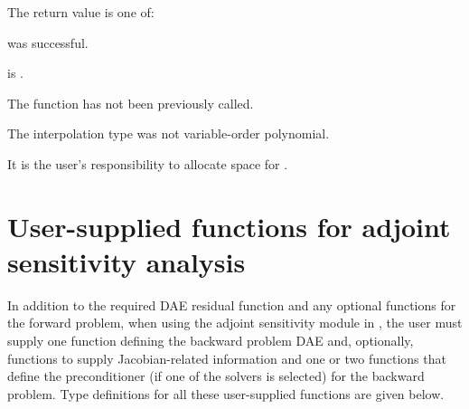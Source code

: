 {
  The return value  is one of:
  \begin{args}
  \item[\Id{IDA\_SUCCESS}] 
     was successful.
  \item[\Id{IDA\_MEM\_NULL}] 
     is .
  \item[\Id{IDA\_NO\_ADJ}]
    The function  has not been previously called.
  \item[\Id{IDA\_ILL\_INPUT}]
    The interpolation type was not variable-order polynomial.
  \end{args}
}
{
  It is the user's responsibility to allocate space for .
}
\section{User-supplied functions for adjoint sensitivity analysis}
\label{ss:user_fct_adj}

In addition to the required DAE residual function and any optional functions
for the forward problem, when using the adjoint sensitivity module in {\idas},
the user must supply one function defining the backward problem DAE and, optionally,
functions to supply Jacobian-related information and one or two functions 
that define the preconditioner (if one of the {\idaspils} solvers is
selected) for the backward problem.
Type definitions for all these user-supplied functions are given below.

